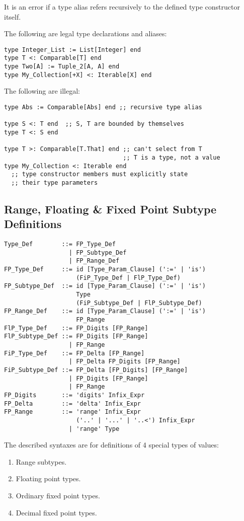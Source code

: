 It is an error if a type alias refers recursively to the defined type constructor itself. 

\example The following are legal type declarations and aliases:
\begin{lstlisting}
type Integer_List := List[Integer] end
type T <: Comparable[T] end
type Two[A] := Tuple_2[A, A] end
type My_Collection[+X] <: Iterable[X] end
\end{lstlisting}
The following are illegal:
\begin{lstlisting}
type Abs := Comparable[Abs] end ;; recursive type alias

type S <: T end  ;; S, T are bounded by themselves
type T <: S end

type T >: Comparable[T.That] end ;; can't select from T
                                 ;; T is a type, not a value
type My_Collection <: Iterable end
  ;; type constructor members must explicitly state
  ;; their type parameters
\end{lstlisting}





\subsection{Range, Floating \& Fixed Point Subtype Definitions}
\label{sec:fl-fi-subtypes}

\syntax\begin{lstlisting}
Type_Def        ::= FP_Type_Def 
                  | FP_Subtype_Def 
                  | FP_Range_Def
FP_Type_Def     ::= id [Type_Param_Clause] (':=' | 'is')
                    (FiP_Type_Def | FlP_Type_Def) 
FP_Subtype_Def  ::= id [Type_Param_Clause] (':=' | 'is') 
                    Type
                    (FiP_Subtype_Def | FlP_Subtype_Def) 
FP_Range_Def    ::= id [Type_Param_Clause] (':=' | 'is') 
                    FP_Range
FlP_Type_Def    ::= FP_Digits [FP_Range]
FlP_Subtype_Def ::= FP_Digits [FP_Range]
                  | FP_Range
FiP_Type_Def    ::= FP_Delta [FP_Range] 
                  | FP_Delta FP_Digits [FP_Range]
FiP_Subtype_Def ::= FP_Delta [FP_Digits] [FP_Range]
                  | FP_Digits [FP_Range]
                  | FP_Range
FP_Digits       ::= 'digits' Infix_Expr
FP_Delta        ::= 'delta' Infix_Expr
FP_Range        ::= 'range' Infix_Expr 
                    ('..' | '...' | '..<') Infix_Expr
                  | 'range' Type
\end{lstlisting}

The described syntaxes are for definitions of 4 special types of values:
\begin{enumerate}
  \item Range subtypes.
  \item Floating point types. 
  \item Ordinary fixed point types. 
  \item Decimal fixed point types. 
\end{enumerate}

